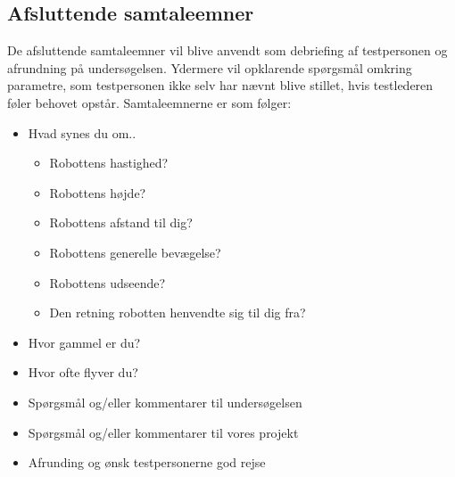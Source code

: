 \subsection{Afsluttende samtaleemner} 
\label{ParametreAfrundingDebriefing}
%
De afsluttende samtaleemner vil blive anvendt som debriefing af testpersonen og afrundning på undersøgelsen. Ydermere vil opklarende spørgsmål omkring parametre, som testpersonen ikke selv har nævnt blive stillet, hvis testlederen føler behovet opstår. Samtaleemnerne er som følger: \blankline
%
\begin{itemize}
\item Hvad synes du om..
	\begin{itemize}
		\item Robottens hastighed?
		\item Robottens højde?
		\item Robottens afstand til dig?
		\item Robottens generelle bevægelse?
		\item Robottens udseende?
		\item Den retning robotten henvendte sig til dig fra?
	\end{itemize}
\item Hvor gammel er du?
\item Hvor ofte flyver du?
\item Spørgsmål og/eller kommentarer til undersøgelsen 
\item Spørgsmål og/eller kommentarer til vores projekt
\item Afrunding og ønsk testpersonerne god rejse
\end{itemize}

